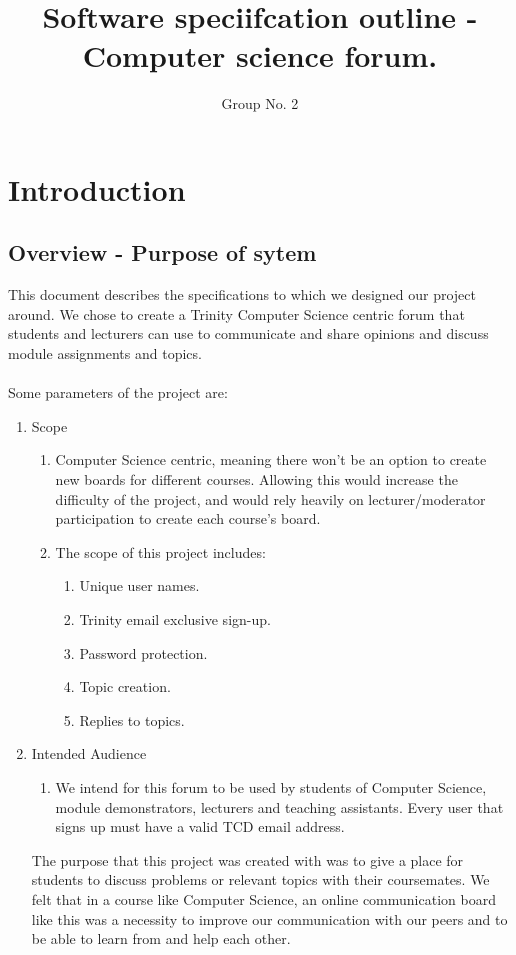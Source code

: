 \documentclass[a4paper, 12pt]{article}
\begin{document}
	\title{Software speciifcation outline - Computer science forum.}
	\author{Group No. 2}
	\maketitle
	\section{Introduction}
		\subsection{Overview - Purpose of sytem}
		\par This document describes the specifications to which we designed our project around. We chose to create a Trinity Computer 
		Science centric forum that students and lecturers can use to communicate and share opinions and discuss module assignments and topics.
		\\\\Some parameters of the project are:
			\begin{enumerate}[label*=\arabic*.]
				\item Scope
				\begin{enumerate}[label*=\arabic*.]
					\item Computer Science centric, meaning there won’t be an option to 
					create new boards for different courses. Allowing this would increase 
					the difficulty of the project, and would rely heavily on lecturer/moderator participation to create each course’s board. 
					\item The scope of this project includes:
					\begin{enumerate}[label*=\arabic*.]
						\item Unique user names.
						\item Trinity email exclusive sign-up.
						\item Password protection.
						\item Topic creation.
						\item Replies to topics.
					\end{enumerate}
				\end{enumerate}

				\newpage
				\item Intended Audience
				\begin{enumerate}[label*=\arabic*.]
					\item We intend for this forum to be used by students of Computer Science, module demonstrators, lecturers and teaching assistants. Every user that signs up must have a valid TCD email address.
				\end{enumerate}
				\par The purpose that this project was created with was to give a place for students to discuss 
				problems or relevant topics with their coursemates. We felt that in a course like Computer Science, 
				an online communication board like this was a necessity to improve our communication with 
				our peers and to be able to learn from and help each other.
			\end{enumerate}
\end{document}
